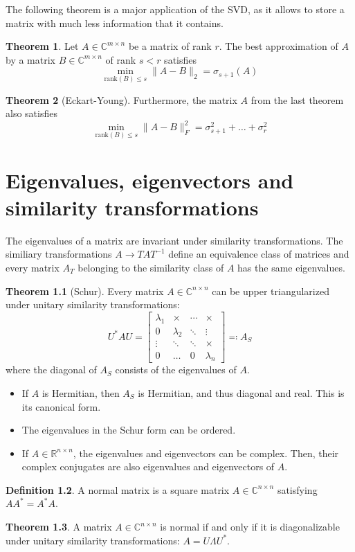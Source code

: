 \documentclass[12pt, openany]{report}
\theoremstyle{definition}
\newtheorem{thm}{Theorem}[chapter]
\newtheorem{definition}[thm]{Definition}
\newcommand{\R}{\mathbb{R}}
\newcommand{\C}{\mathbb{C}}
\begin{document}
The following theorem is a major application of the SVD, as it allows to store a matrix with much less information that it contains.
\begin{thm}
    Let $A\in \C^{m\times n}$ be a matrix of rank $r$. The best approximation of $A$ by a matrix $B\in \C^{m\times n}$ of rank $s<r$ satisfies
    \begin{equation}
        \min_{\text{rank}(B)\le s}\lVert A-B\rVert_2 =\sigma_{s+1}(A)
    \end{equation}
\end{thm}
\begin{thm}[Eckart-Young]
    Furthermore, the matrix $A$ from the last theorem also satisfies
    \begin{equation}
        \min_{\text{rank}(B)\le s}\lVert A-B\rVert _F^2 = \sigma_{s+1}^2 + \dots + \sigma_r^2
    \end{equation}
\end{thm}
\chapter{Eigenvalues, eigenvectors and similarity transformations}
The eigenvalues of a matrix are invariant under similarity transformations. The similiary transformations $A\rightarrow TAT^{-1}$ define an equivalence class of matrices and every matrix $A_T$ belonging to the similarity class of $A$ has the same eigenvalues. 
\begin{thm}[Schur]
    Every matrix $A\in \C^{n\times n}$ can be upper triangularized under unitary similarity transformations:
    \begin{equation}
        U^*AU = \begin{bmatrix}
            \lambda_1 & \times & \cdots & \times\\
            0 & \lambda_2 & \ddots & \vdots\\
            \vdots & \ddots & \ddots & \times\\
            0 & \dots & 0 & \lambda_n
        \end{bmatrix} \eqcolon A_S
    \end{equation}
    where the diagonal of $A_S$ consists of the eigenvalues of $A$.
\end{thm}
\begin{itemize}
    \item If $A$ is Hermitian, then $A_S$ is Hermitian, and thus diagonal and real. This is its canonical form.
    \item The eigenvalues in the Schur form can be ordered. 
    \item If $A\in \R^{n\times n}$, the eigenvalues and eigenvectors can be complex. Then, their complex conjugates are also eigenvalues and eigenvectors of $A$.
\end{itemize}
\begin{definition}
    A normal matrix is a square matrix $A\in \C^{n\times n}$ satisfying $AA^*=A^*A$.
\end{definition}
\begin{thm}
    A matrix $A\in \C^{n\times n}$ is normal if and only if it is diagonalizable under unitary similarity transformations: $A=U\Lambda U^*$.
\end{thm}
\end{document}
